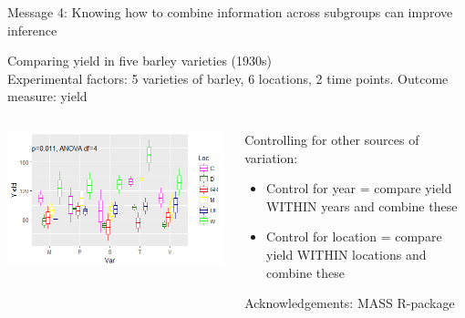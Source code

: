 \documentclass{beamer}
\begin{document}
\begin{frame}{Message 4: Knowing how to combine information across subgroups  can improve inference}
 
  
 Comparing yield in five barley varieties (1930s) \\
 Experimental factors: 5 varieties of barley, 6 locations, 2 time points. Outcome measure: yield
  \begin{columns}
    \begin{column}{0.5\textwidth}
	\begin{center}
	\includegraphics[width=\textwidth]{Figures/message4c}
	\end{center}
    \end{column}
    
    \begin{column}{0.5\textwidth}
    \begin{block}{Controlling for other sources of variation:}
      \begin{itemize}
	\item Control for year = compare yield WITHIN years and combine these
	\item Control for location = compare yield WITHIN locations and combine these
      \end{itemize}
      \end{block}
      \tiny Acknowledgements: MASS R-package
    \end{column}
  \end{columns}
   
\end{frame}
\end{document}
